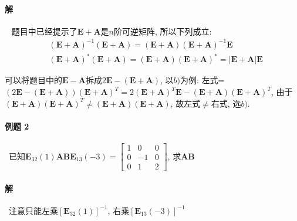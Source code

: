 \paragraph{解}~{} \noindent 题目中已经提示了$ \bm{E}+\bm{A} $是$ n $阶可逆矩阵, 所以下列成立:
\begin{equation*}
\begin{aligned}
& (\bm{E}+\bm{A})^{-1}(\bm{E}+\bm{A})=(\bm{E}+\bm{A})(\bm{E}+\bm{A})^{-1}\bm{E} \\
& (\bm{E}+\bm{A})^{*}(\bm{E}+\bm{A})=(\bm{E}+\bm{A})(\bm{E}+\bm{A})^{*}=|\bm{E}+\bm{A}|\bm{E} 
\end{aligned}
\end{equation*}\par 
可以将题目中的$ \bm{E}-\bm{A} $拆成$ 2\bm{E}-(\bm{E}+\bm{A}) $, 以$ b) $为例: 左式=$ (2 \bm{E}-(\bm{E}+\bm{A}))(\bm{E}+\bm{A})^{T}=2(\bm{E}+\bm{A})^{T}\bm{E}-(\bm{E}+\bm{A})(\bm{E}+\bm{A})^{T}$, 由于$ (\bm{E}+\bm{A})(\bm{E}+\bm{A})^{T}\neq (\bm{E}+\bm{A})(\bm{E}+\bm{A}) $, 故左式$ \neq $右式, 选$ b) $.
\paragraph{例题 2}~{已知$ \bm{E}_{32}(1)\bm{A}\bm{B}\bm{E}_{13}(-3)=
\begin{bmatrix}
1 & 0 & 0 \\
0 & -1 & 0 \\
0 & 1 & 2
\end{bmatrix}$, 求$ \bm{A}\bm{B} $}
\paragraph{解}~{注意只能左乘$ [\bm{E}_{32}(1)]^{-1} $, 右乘$ [\bm{E}_{13}(-3)]^{-1} $}
